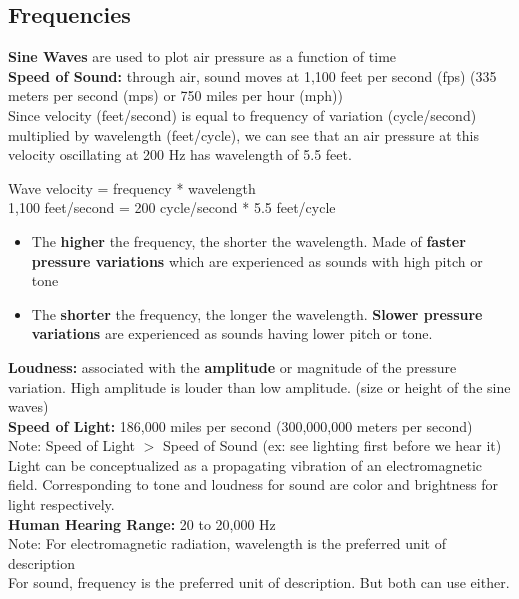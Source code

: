 \documentclass{article}
\begin{document}
\subsection{Frequencies}

\textbf{Sine Waves} are used to plot air pressure as a function of time \\

\noindent \textbf{Speed of Sound:} through air, sound moves at 1,100 feet per second (fps) (335 meters per second (mps) or 750 miles per hour (mph)) \\
Since velocity (feet/second) is equal to frequency of variation (cycle/second) multiplied by wavelength (feet/cycle), we can see that an air pressure at this velocity oscillating at 200 Hz has wavelength of 5.5 feet. \\
\begin{center}
Wave velocity = frequency * wavelength \\
1,100 feet/second = 200 cycle/second * 5.5 feet/cycle \\
\end{center}

\begin{itemize}
    \item The \textbf{higher} the frequency, the shorter the wavelength. Made of \textbf{faster pressure variations} which are experienced as sounds with high pitch or tone 
    \item The \textbf{shorter} the frequency, the longer the wavelength. \textbf{Slower pressure variations} are experienced as sounds having lower pitch or tone. 
\end{itemize}

\noindent \textbf{Loudness:} associated with the \textbf{amplitude} or magnitude of the pressure variation. High amplitude is louder than low amplitude. (size or height of the sine waves) \\

\noindent \textbf{Speed of Light:} 186,000 miles per second (300,000,000 meters per second) \\
Note: Speed of Light $>$ Speed of Sound (ex: see lighting first before we hear it)\\
Light can be conceptualized as a propagating vibration of an electromagnetic field. Corresponding to tone and loudness for sound are color and brightness for light respectively. \\

\noindent \textbf{Human Hearing Range:} 20 to 20,000 Hz \\ 
Note: For electromagnetic radiation, wavelength is the preferred unit of description \\
For sound, frequency is the preferred unit of description. But both can use either. \\
\end{document}
